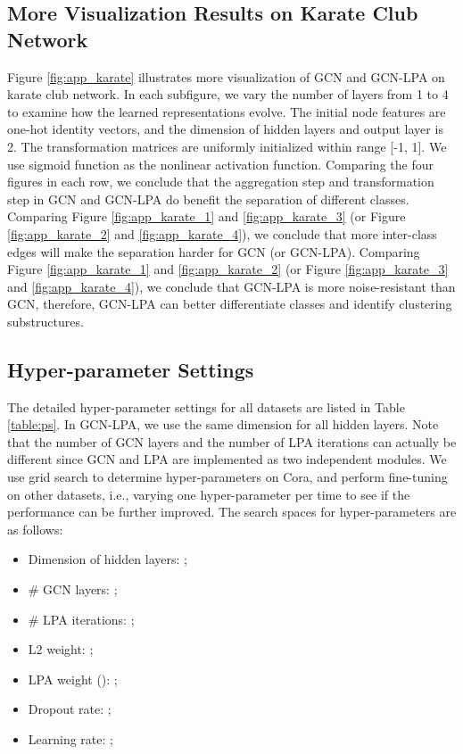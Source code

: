 \documentclass{article}
\begin{document}
	\subsection{More Visualization Results on Karate Club Network}
	\label{app:e}
		Figure \ref{fig:app_karate} illustrates more visualization of GCN and GCN-LPA on karate club network.
		In each subfigure, we vary the number of layers from 1 to 4 to examine how the learned representations evolve.
The initial node features are one-hot identity vectors, and the dimension of hidden layers and output layer is 2.
		The transformation matrices are uniformly initialized within range [-1, 1].
		We use sigmoid function as the nonlinear activation function.
		Comparing the four figures in each row, we conclude that the aggregation step and transformation step in GCN and GCN-LPA do benefit the separation of different classes.
		Comparing Figure \ref{fig:app_karate_1} and \ref{fig:app_karate_3} (or Figure \ref{fig:app_karate_2} and \ref{fig:app_karate_4}), we conclude that more inter-class edges will make the separation harder for GCN (or GCN-LPA).		Comparing Figure \ref{fig:app_karate_1} and \ref{fig:app_karate_2} (or Figure \ref{fig:app_karate_3} and \ref{fig:app_karate_4}), we conclude that GCN-LPA is more noise-resistant than GCN, therefore, GCN-LPA can better differentiate classes and identify clustering substructures.
		
		
	\subsection{Hyper-parameter Settings}
	\label{app:f}
		The detailed hyper-parameter settings for all datasets are listed in Table \ref{table:ps}.
		In GCN-LPA, we use the same dimension for all hidden layers.
		Note that the number of GCN layers and the number of LPA iterations can actually be different since GCN and LPA are implemented as two independent modules.
		We use grid search to determine hyper-parameters on Cora, and perform fine-tuning on other datasets, i.e., varying one hyper-parameter per time to see if the performance can be further improved.
		The search spaces for hyper-parameters are as follows:
		\begin{itemize}
			\item Dimension of hidden layers: ;
			\item \# GCN layers: ;
			\item \# LPA iterations: ;
			\item L2 weight: ;
			\item LPA weight (): ;
			\item Dropout rate: ;
			\item Learning rate: ;
		\end{itemize}
		
\end{document}
